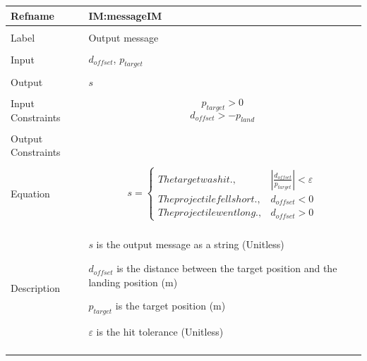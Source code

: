 \documentclass[12pt]{article}
\begin{document}
\noindent \begin{minipage}{\textwidth}
\begin{tabular}{p{} p{}}
\toprule \textbf{Refname} & \textbf{IM:messageIM}
\label{IM:messageIM}
\\ \midrule \\
Label & Output message
\\ \midrule \\
Input & ${d_{offset}}$, ${p_{target}}$
\\ \midrule \\
Output & $s$
\\ \midrule \\
Input Constraints & \begin{displaymath}
                    {p_{target}}>0
                    \end{displaymath}
                    \begin{displaymath}
                    {d_{offset}}>-{p_{land}}
                    \end{displaymath}
\\ \midrule \\
Output Constraints & 
\\ \midrule \\
Equation & \begin{displaymath}
           s=\begin{cases}
The target was hit., & |\frac{{d_{offset}}}{{p_{target}}}|<ε\\
The projectile fell short., & {d_{offset}}<0\\
The projectile went long., & {d_{offset}}>0
\end{cases}
           \end{displaymath}
\\ \midrule \\
Description & \begin{symbDescription}
              \item{$s$ is the output message as a string (Unitless)}
              \item{${d_{offset}}$ is the distance between the target position and the landing position (m)}
              \item{${p_{target}}$ is the target position (m)}
              \item{$ε$ is the hit tolerance (Unitless)}
              \end{symbDescription}
\\ \midrule \\

\end{tabular}
\end{minipage}
\end{document}
